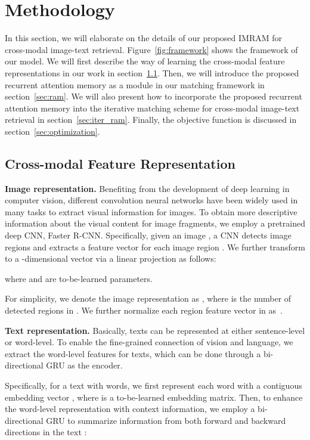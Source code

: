 \documentclass[10pt,twocolumn,letterpaper]{article}
\begin{document}
\section{Methodology}

In this section, we will elaborate on the details of our proposed IMRAM for cross-modal image-text retrieval. Figure~\ref{fig:framework} shows the framework of our model. We will first describe the way of learning the cross-modal feature representations in our work in section~\ref{sec:feature_representation}. Then, we will introduce the proposed recurrent attention memory as a module in our matching framework in section~\ref{sec:ram}. We will also present how to incorporate the proposed recurrent attention memory into the iterative matching scheme for cross-modal image-text retrieval in section~\ref{sec:iter_ram}. Finally, the objective function is discussed in section~\ref{sec:optimization}.

\subsection{Cross-modal Feature Representation}
\label{sec:feature_representation}
\textbf{Image representation.}
Benefiting from the development of deep learning in computer vision, different convolution neural networks have been widely used in many tasks to extract visual information for images. To obtain more descriptive information about the visual content for image fragments, we employ a pretrained deep CNN, \eg{} Faster R-CNN. Specifically, given an image , a CNN detects image regions and extracts a feature vector  for each image region . We further transform  to a -dimensional vector  via a linear projection as follows:

where  and  are to-be-learned parameters.

For simplicity, we denote the image representation as , where  is the number of detected regions in . We further normalize each region feature vector in  as~\cite{lee2018stacked}.

\textbf{Text representation.}
Basically, texts can be represented at either sentence-level or word-level. To enable the fine-grained connection of vision and language, we extract the word-level features for texts, which can be done through a bi-directional GRU as the encoder. 

Specifically, for a text  with  words, we first represent each word  with a contiguous embedding vector , where  is a to-be-learned embedding matrix. Then, to enhance the word-level representation with context information, we employ a bi-directional GRU to summarize information from both forward and backward directions in the text :
\end{document}
